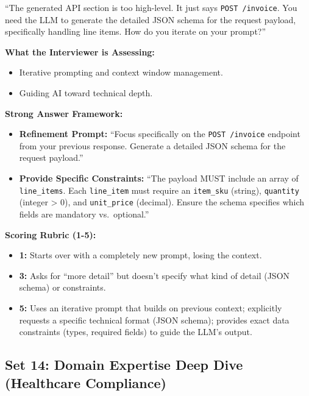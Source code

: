 \documentclass[
  11pt,
  openany,
  oneside]{book}
\providecommand{\tightlist}{%
  \setlength{\itemsep}{0pt}\setlength{\parskip}{0pt}}
\begin{document}
``The generated API section is too high-level. It just says
\texttt{POST\ /invoice}. You need the LLM to generate the detailed JSON
schema for the request payload, specifically handling line items. How do
you iterate on your prompt?''

\textbf{What the Interviewer is Assessing:}

\begin{itemize}
\tightlist
\item
  Iterative prompting and context window management.
\item
  Guiding AI toward technical depth.
\end{itemize}

\textbf{Strong Answer Framework:}

\begin{itemize}
\tightlist
\item
  \textbf{Refinement Prompt:} ``Focus specifically on the
  \texttt{POST\ /invoice} endpoint from your previous response. Generate
  a detailed JSON schema for the request payload.''
\item
  \textbf{Provide Specific Constraints:} ``The payload MUST include an
  array of \texttt{line\_items}. Each \texttt{line\_item} must require
  an \texttt{item\_sku} (string), \texttt{quantity} (integer
  \textgreater{} 0), and \texttt{unit\_price} (decimal). Ensure the
  schema specifies which fields are mandatory vs.~optional.''
\end{itemize}

\textbf{Scoring Rubric (1-5):}

\begin{itemize}
\tightlist
\item
  \textbf{1:} Starts over with a completely new prompt, losing the
  context.
\item
  \textbf{3:} Asks for ``more detail'' but doesn't specify what kind of
  detail (JSON schema) or constraints.
\item
  \textbf{5:} Uses an iterative prompt that builds on previous context;
  explicitly requests a specific technical format (JSON schema);
  provides exact data constraints (types, required fields) to guide the
  LLM's output.
\end{itemize}

\bigskip

\subsection{Set 14: Domain Expertise Deep Dive (Healthcare
Compliance)}\label{set-14-domain-expertise-deep-dive-healthcare-compliance}
\end{document}
